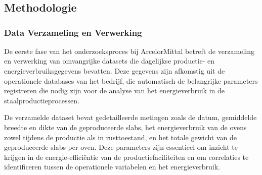 
\chapter{}%
\label{ch:methodologie}

\section{Methodologie}

\subsection{Data Verzameling en Verwerking}
De eerste fase van het onderzoeksproces bij ArcelorMittal betreft de verzameling en verwerking van omvangrijke datasets die dagelijkse productie- en energieverbruiksgegevens bevatten. Deze gegevens zijn afkomstig uit de operationele databases van het bedrijf, die automatisch de belangrijke parameters registreren die nodig zijn voor de analyse van het energieverbruik in de staalproductieprocessen.

De verzamelde dataset bevat gedetailleerde metingen zoals de datum, gemiddelde breedte en dikte van de geproduceerde slabs, het energieverbruik van de ovens zowel tijdens de productie als in rusttoestand, en het totale gewicht van de geproduceerde slabs per oven. Deze parameters zijn essentieel om inzicht te krijgen in de energie-efficiëntie van de productiefaciliteiten en om correlaties te identificeren tussen de operationele variabelen en het energieverbruik.

